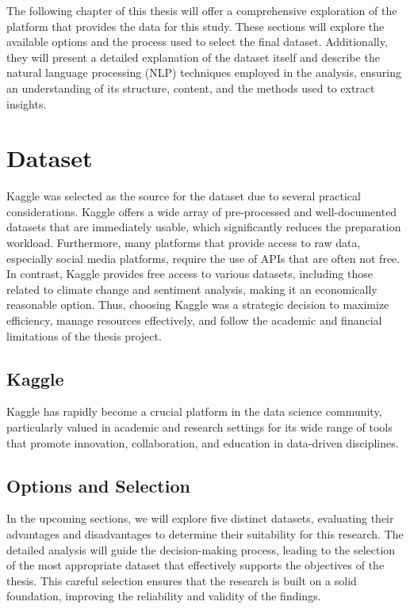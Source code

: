 The following chapter of this thesis will offer a comprehensive exploration of the platform that provides the data for this study. These sections will explore the available options and the process used to select the final dataset. Additionally, they will present a detailed explanation of the dataset itself and describe the natural language processing (NLP) techniques employed in the analysis, ensuring an understanding of its structure, content, and the methods used to extract insights.

\section{Dataset}
\label{subsec:datasets}
Kaggle was selected as the source for the dataset due to several practical considerations. Kaggle offers a wide array of pre-processed and well-documented datasets that are immediately usable, which significantly reduces the preparation workload.
Furthermore, many platforms that provide access to raw data, especially social media platforms, require the use of APIs that are often not free. In contrast, Kaggle provides free access to various datasets, including those related to climate change and sentiment analysis, making it an economically reasonable option. Thus, choosing Kaggle was a strategic decision to maximize efficiency, manage resources effectively, and follow the academic and financial limitations of the thesis project.

\subsection{Kaggle}
Kaggle has rapidly become a crucial platform in the data science community, particularly valued in academic and research settings for its wide range of tools that promote innovation, collaboration, and education in data-driven disciplines.

\subsection{Options and Selection}
In the upcoming sections, we will explore five distinct datasets, evaluating their advantages and disadvantages to determine their suitability for this research. The detailed analysis will guide the decision-making process, leading to the selection of the most appropriate dataset that effectively supports the objectives of the thesis. This careful selection ensures that the research is built on a solid foundation, improving the reliability and validity of the findings.

